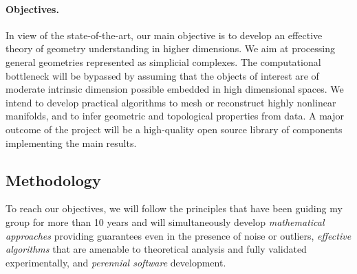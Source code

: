 \paragraph{Objectives.} In view of the state-of-the-art, our main objective is 
to develop an effective theory of geometry understanding in higher dimensions. We aim at processing general geometries represented as simplicial complexes. The computational bottleneck will be bypassed by assuming that the objects of interest are of moderate intrinsic dimension possible embedded in high dimensional spaces. We intend to develop practical algorithms to mesh or reconstruct highly nonlinear manifolds, and to infer geometric and topological properties from data. A major outcome of the project will be a high-quality open source library of components implementing the main results.





\subsection{Methodology}
To reach our objectives, we will follow the principles that have been guiding my group for more than 10 years and will simultaneously develop
{\em mathematical approaches} providing guarantees even in the presence of noise or outliers,
{\em effective algorithms} that are amenable to theoretical analysis and fully validated experimentally,
and {\em perennial software} development.

